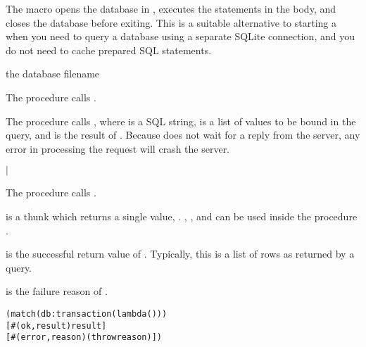 The  macro opens the database in ,
executes the statements in the body, and closes the database before
exiting.  This is a suitable alternative to starting a
 when you need to query a database using a separate
SQLite connection, and you do not need to cache prepared SQL
statements.

\begin{procedure}
\end{procedure}
\returns{} the database filename

The  procedure calls .

\begin{procedure}
\end{procedure}
\returns{}

The  procedure calls , where  is a SQL string,
 is a list of values to be bound in the query, and
 is the result of .
Because  does not wait for a reply from the server, any
error in processing the request will crash the server.

\begin{procedure}
\end{procedure}
\returns{}
 $|$

The  procedure calls .

 is a thunk which returns a single value,
. , , and
 can be used inside the procedure .

 is the successful return value of . Typically,
this is a list of rows as returned by a  query.

 is the failure reason of .

\begin{syntax}
\end{syntax}
\expandsto{} \antipar\begin{alltt}
(match (db:transaction  (lambda ()  \etc))
  [#(ok ,result) result]
  [#(error ,reason) (throw reason)])
\end{alltt}

